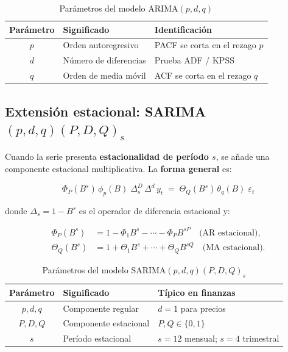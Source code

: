 \documentclass[12pt,a4paper]{article}
\begin{document}
\begin{table}[H]
\centering
\caption{Parámetros del modelo ARIMA$(p,d,q)$}
\begin{tabular}{cll}
\toprule
\textbf{Parámetro} & \textbf{Significado} & \textbf{Identificación} \\
\midrule
$p$ & Orden autoregresivo   & PACF se corta en el rezago $p$ \\
$d$ & Número de diferencias & Prueba ADF / KPSS \\
$q$ & Orden de media móvil  & ACF se corta en el rezago $q$ \\
\bottomrule
\end{tabular}
\end{table}

\subsection{Extensión estacional: SARIMA$(p,d,q)(P,D,Q)_s$}

Cuando la serie presenta \textbf{estacionalidad de período $s$}, se añade una
componente estacional multiplicativa. La \textbf{forma general} es:

\begin{equation}
  \boxed{
    \Phi_P(B^s)\,\phi_p(B)\;\Delta_s^D\,\Delta^d\,y_t
    \;=\;
    \Theta_Q(B^s)\,\theta_q(B)\;\varepsilon_t
  }
  \label{eq:sarima}
\end{equation}

donde $\Delta_s = 1 - B^s$ es el operador de diferencia estacional y:

\begin{align}
  \Phi_P(B^s)   &= 1 - \Phi_1 B^s - \cdots - \Phi_P B^{sP}
                   \quad \text{(AR estacional)}, \\
  \Theta_Q(B^s) &= 1 + \Theta_1 B^s + \cdots + \Theta_Q B^{sQ}
                   \quad \text{(MA estacional)}.
\end{align}

\begin{table}[H]
\centering
\caption{Parámetros del modelo SARIMA$(p,d,q)(P,D,Q)_s$}
\begin{tabular}{cll}
\toprule
\textbf{Parámetro} & \textbf{Significado} & \textbf{Típico en finanzas} \\
\midrule
$p,d,q$   & Componente regular    & $d=1$ para precios \\
$P,D,Q$   & Componente estacional & $P,Q\in\{0,1\}$ \\
$s$       & Período estacional    & $s=12$ mensual; $s=4$ trimestral \\
\bottomrule
\end{tabular}
\end{table}
\end{document}
